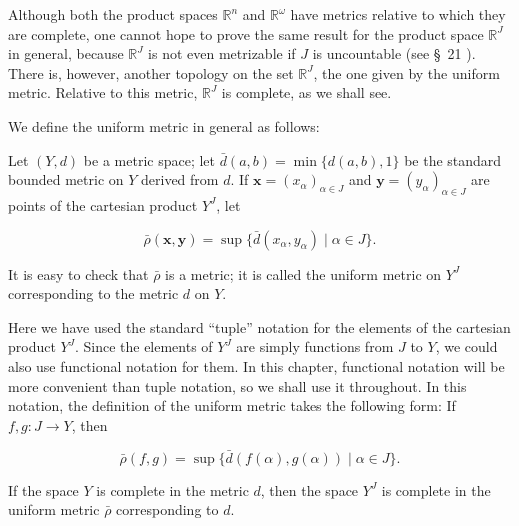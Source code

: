 Although both the product spaces \(\mathbb{R}^{n}\) and \(\mathbb{R}^{\omega }\) have metrics relative to which they are complete, one cannot hope to prove the same result for the product space \(\mathbb{R}^{J}\) in general, because \(\mathbb{R}^{J}\) is not even metrizable if \(J\) is uncountable (see \S\ 21 ). There is, however, another topology on the set \(\mathbb{R}^{J}\), the one given by the uniform metric. Relative to this metric, \(\mathbb{R}^{J}\) is complete, as we shall see.

We define the uniform metric in general as follows:

\begin{definition}
Let \((Y, d)\) be a metric space; let \(\bar{d}({a,b}) = \min \{ d({a,b}),1\}\) be the standard bounded metric on \(Y\) derived from \(d\). If \(\mathbf{x} = {(x_{\alpha }) }_{\alpha \in J}\) and \(\mathbf{y} = {(y_{\alpha }) }_{\alpha \in J}\) are points of the cartesian product \(Y^{J}\), let

\[
\bar{\rho }({\mathbf{x},\mathbf{y}}) = \sup \{ {\bar{d}({x_{\alpha },y_{\alpha }}) \mid \alpha \in J}\}.
\]

It is easy to check that \(\bar{\rho }\) is a metric; it is called the uniform metric on \(Y^{J}\) corresponding to the metric \(d\) on \(Y\).
\end{definition}

Here we have used the standard ``tuple'' notation for the elements of the cartesian product \(Y^{J}\). Since the elements of \(Y^{J}\) are simply functions from \(J\) to \(Y\), we could also use functional notation for them. In this chapter, functional notation will be more convenient than tuple notation, so we shall use it throughout. In this notation, the definition of the uniform metric takes the following form: If \(f,g : J \rightarrow Y\), then

\[
\bar{\rho }({f,g}) = \sup \{ \bar{d}({f( \alpha ),g( \alpha ) }) \mid \alpha \in J\}.
\]

\begin{theorem}
\label{thm:\thetheorem}
If the space \(Y\) is complete in the metric \(d\), then the space \(Y^{J}\) is complete in the uniform metric \(\bar{\rho }\) corresponding to \(d\).
\end{theorem}

